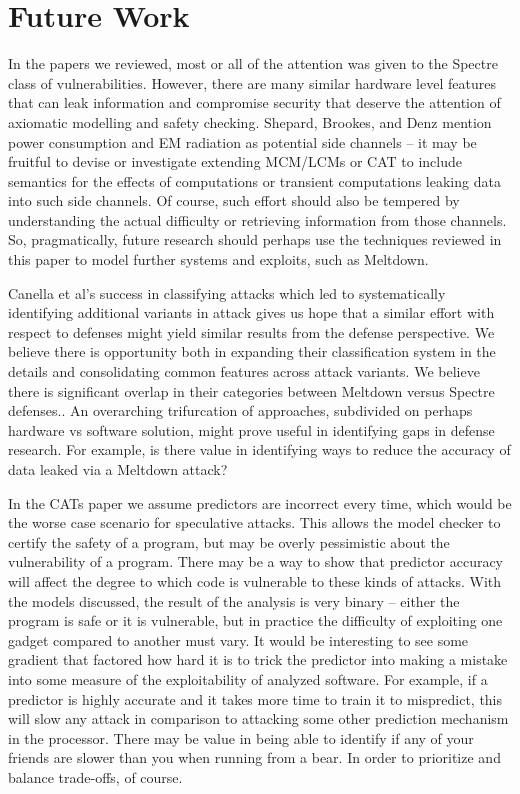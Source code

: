 \documentclass[11pt,conference]{IEEEtran}
\begin{document}
\section{Future Work}\label{sec:future}

In the papers we reviewed, most or all of the attention was given to the Spectre class of vulnerabilities.
However, there are many similar hardware level features that can leak information and compromise security that deserve the attention of axiomatic modelling and safety checking.
Shepard, Brookes, and Denz \cite{shepherd2022transient} mention power consumption and EM radiation as potential side channels -- it may be fruitful to devise or investigate extending MCM/LCMs or CAT to include semantics for the effects of computations or transient computations leaking data into such side channels.
Of course, such effort should also be tempered by understanding the actual difficulty or retrieving information from those channels.
So, pragmatically, future research should perhaps use the techniques reviewed in this paper to model further systems and exploits, such as Meltdown.

Canella et al's\cite{canella2019} success in classifying attacks which led to systematically identifying additional variants in attack gives us hope that a similar effort with respect to defenses might yield similar results from the defense perspective.
We believe there is opportunity both in expanding their classification system in the details and consolidating common features across attack variants.
We believe there is significant overlap in their categories between Meltdown versus Spectre defenses..
An overarching trifurcation of approaches, subdivided on perhaps hardware vs software solution, might prove useful in identifying gaps in defense research.
For example, is there value in identifying ways to reduce the accuracy of data leaked via a Meltdown attack?

In the CATs paper\cite{cats2022} we assume predictors are incorrect every time, which would be the worse case scenario for speculative attacks.
This allows the model checker to certify the safety of a program, but may be overly pessimistic about the vulnerability of a program.
There may be a way to show that predictor accuracy will affect the degree to which code is vulnerable to these kinds of attacks.
With the models discussed, the result of the analysis is very binary -- either the program is safe or it is vulnerable, but in practice the difficulty of exploiting one gadget compared to another must vary.
It would be interesting to see some gradient that factored how hard it is to trick the predictor into making a mistake into some measure of the exploitability of analyzed software.
For example, if a predictor is highly accurate and it takes more time to train it to mispredict, this will slow any attack in comparison to attacking some other prediction mechanism in the processor.
There may be value in being able to identify if any of your friends are slower than you when running from a bear.
In order to prioritize and balance trade-offs, of course.
\end{document}
